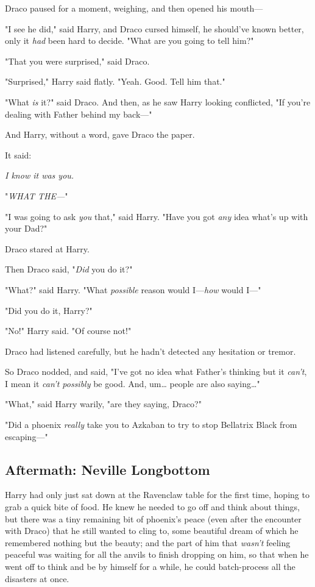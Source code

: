 Draco paused for a moment, weighing, and then opened his mouth---

"I see he did," said Harry, and Draco cursed himself, he should've known 
better, only it \emph{had} been hard to decide. "What are you going to tell 
him?"

"That you were surprised," said Draco.

"Surprised," Harry said flatly. "Yeah. Good. Tell him that."

"What \emph{is} it?" said Draco. And then, as he saw Harry looking conflicted, 
"If you're dealing with Father behind my back---"

And Harry, without a word, gave Draco the paper.

It said:

\emph{I know it was you.}

"\emph{WHAT THE---}"

"I was going to ask \emph{you} that," said Harry. "Have you got \emph{any} idea 
what's up with your Dad?"

Draco stared at Harry.

Then Draco said, "\emph{Did} you do it?"

"What?" said Harry. "What \emph{possible} reason would I---\emph{how} would 
I---"

"Did you do it, Harry?"

"No!" Harry said. "Of course not!"

Draco had listened carefully, but he hadn't detected any hesitation or tremor.

So Draco nodded, and said, "I've got no idea what Father's thinking but it 
\emph{can't}, I mean it \emph{can't possibly} be good. And, um{\ldots} people 
are also saying{\ldots}"

"What," said Harry warily, "are they saying, Draco?"

"Did a phoenix \emph{really} take you to Azkaban to try to stop Bellatrix Black 
from escaping---"
\sbreak
\vspace{-2\baselineskip}
\subsection{Aftermath: Neville Longbottom}

Harry had only just sat down at the Ravenclaw table for the first time, hoping 
to grab a quick bite of food. He knew he needed to go off and think about 
things, but there was a tiny remaining bit of phoenix's peace (even after the 
encounter with Draco) that he still wanted to cling to, some beautiful dream of 
which he remembered nothing but the beauty; and the part of him that 
\emph{wasn't} feeling peaceful was waiting for all the anvils to finish 
dropping on him, so that when he went off to think and be by himself for a 
while, he could batch-process all the disasters at once.

